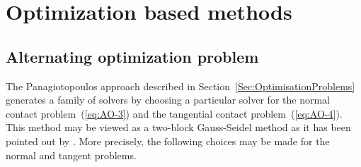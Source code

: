 



 

\section{Optimization based methods}
\label{Sec:OptimisationBasedMethods}

\subsection{Alternating optimization problem}

The Panagiotopoulos approach described in Section~\ref{Sec:OptimisationProblems} generates a family of solvers by choosing a particular solver for the normal contact problem~(\ref{eq:AO-3}) and the tangential contact problem~(\ref{eq:AO-4}). This method may be viewed as a two-block Gauss-Seidel method as it has been pointed out by \cite{Tzaferopoulos_CS1993}. More precisely, the following choices may be made for the normal and tangent problems.

